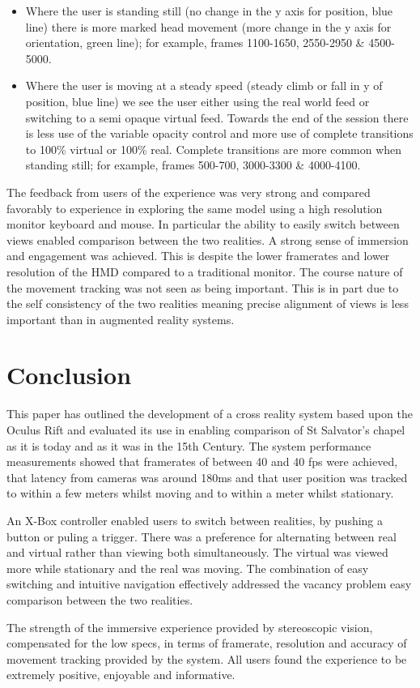 \documentclass[conference]{acmsiggraph}
\begin{document}
\begin{itemize}
	\item Where the user is standing still (no change in the y axis for position, blue line) there is more marked head movement (more change in the y axis for orientation, green line); for example, frames 1100-1650, 2550-2950 \& 4500-5000.
	\item Where the user is moving at a steady speed (steady climb or fall in y of position, blue line) we see the user either using the real world feed or switching to a semi opaque virtual feed. Towards the end of the session there is less use of the variable opacity control and more use of complete transitions to 100\% virtual or 100\% real. Complete transitions are more common when standing still; for example, frames 500-700, 3000-3300 \& 4000-4100.
\end{itemize}

The feedback from users of the experience was very strong and compared favorably to experience in exploring the same model using a high resolution monitor keyboard and mouse. In particular the ability to easily switch between views enabled comparison between the two realities. A strong sense of immersion and engagement was achieved. This is despite the lower framerates and lower resolution of the HMD compared to a traditional monitor. The course nature of the movement tracking was not seen as being important. This is in part due to the self consistency of the two realities meaning precise alignment of views is less important than in augmented reality systems. 

\section{Conclusion}
This paper has outlined the development of a cross reality system based upon the Oculus Rift and evaluated its use in enabling comparison of St Salvator's chapel as it is today and as it was in the 15th Century. The system performance measurements showed that framerates of between 40 and 40 fps were achieved, that latency from cameras was around 180ms and that user position was tracked to within a few meters whilst moving and to within a meter whilst stationary. 

An X-Box controller enabled users to switch between realities, by pushing a button or puling a trigger. There was a preference for alternating between real and virtual rather than viewing both simultaneously. The virtual was viewed more while stationary and the real was moving. The combination of easy switching and intuitive navigation effectively addressed the vacancy problem easy comparison between the two realities.

 The strength of the immersive experience provided by stereoscopic vision, compensated for the low specs, in terms of framerate, resolution and accuracy of movement tracking provided by the system. All users found the experience to be extremely positive, enjoyable and informative.   





\appendix
\end{document}

